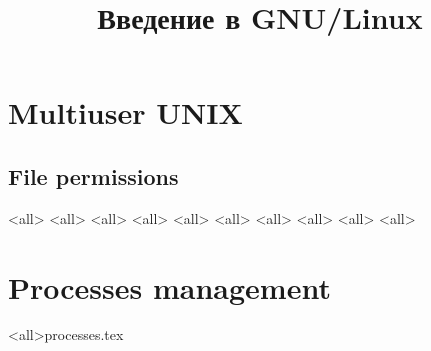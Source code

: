 

\title{Введение в GNU/Linux}





\begin{frame}
	\frametitle{}
	\titlepage
	\vspace{-0.5cm}
	\begin{center}
	\end{center}
\end{frame}



\section{Multiuser UNIX}
\subsection{File permissions}
\mode<all>{}
\mode<all>{}
\mode<all>{}
\mode<all>{}
\mode<all>{}
\mode<all>{}
\mode<all>{}
\mode<all>{}
\mode<all>{}
\mode<all>{}
\section{Processes management}
\mode<all>{{processes.tex}}
